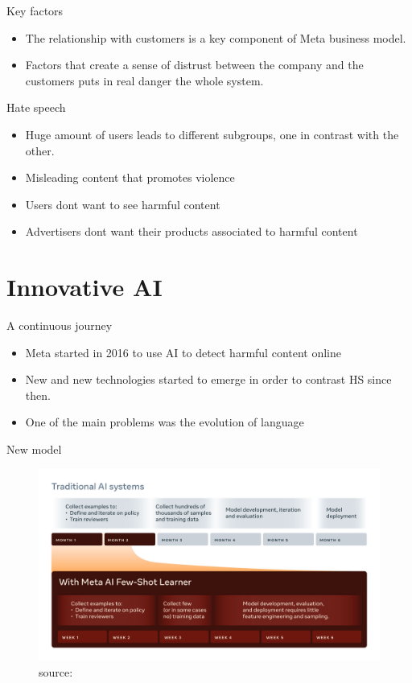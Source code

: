 \documentclass{beamer}
\begin{document}
\begin{frame}{Key factors}
  \begin{itemize}
  \item The relationship with customers is a key component of Meta
    business model.
  \item Factors that create a sense of distrust between the company
    and the customers puts in real danger the whole system.
  \end{itemize}
\end{frame}

\begin{frame}{Hate speech}
  \begin{itemize}
  \item Huge amount of users leads to different subgroups, one in
    contrast with the other.
  \item Misleading content that promotes violence
  \item Users dont want to see harmful content
  \item Advertisers dont want their products associated to harmful
    content
  \end{itemize}
\end{frame}

\section{Innovative AI}
\begin{frame}{A continuous journey}
  \begin{itemize}
  \item Meta started in 2016 to use AI to detect harmful content
    online
  \item New and new technologies started to emerge in order to
    contrast HS since then.
  \item One of the main problems was the evolution of language
  \end{itemize}
\end{frame}

\begin{frame}{New model}
  \begin{figure}
    \centering
    \includegraphics[width=.8\textwidth]{images/fsl_timeline}
    \caption{source: \cite{site:AIart2}}
  \end{figure}
\end{frame}
\end{document}
